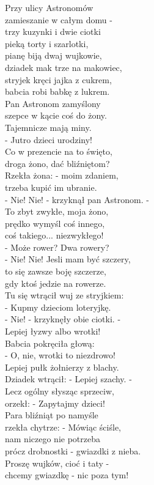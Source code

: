\documentclass[11pt,a4pape,leqno,twoside]{book}
\begin{document}
Przy ulicy Astronomów\\
zamieszanie w całym domu -\\
trzy kuzynki i dwie ciotki\\
pieką torty i szarlotki,\\
pianę biją dwaj wujkowie,\\
dziadek mak trze na makowiec,\\
stryjek kręci jajka z cukrem,\\
babcia robi babkę z lukrem.\\
Pan Astronom zamyślony\\
szepce w kącie coś do żony.\\
Tajemnicze mają miny.\\
- Jutro dzieci urodziny!\\
Co w prezencie na to święto,\\
droga żono, dać bliźniętom?\\
Rzekła żona: - moim zdaniem,\\
trzeba kupić im ubranie.\\
- Nie! Nie! - krzyknął pan Astronom. -\\
To zbyt zwykłe, moja żono,\\
prędko wymyśl coś innego,\\
coś takiego... niezwykłego!\\
- Może rower? Dwa rowery?\\
- Nie! Nie! Jesli mam być szczery,\\
to się zawsze boję szczerze,\\
gdy ktoś jedzie na rowerze.\\
Tu się wtrącił wuj ze stryjkiem:\\
- Kupmy dzieciom loteryjkę.\\
- Nie! - krzyknęły obie ciotki. -\\
Lepiej łyzwy albo wrotki!\\
Babcia pokręciła głową:\\
- O, nie, wrotki to niezdrowo!\\
Lepiej pułk żołnierzy z blachy.\\
Dziadek wtrącił: - Lepiej szachy. -\\
Lecz ogólny słysząc sprzeciw,\\
orzekł: - Zapytajmy dzieci!\\
Para bliźniąt po namyśle\\
rzekła chytrze: - Mówiąc ściśle,\\
nam niczego nie potrzeba\\
prócz drobnostki - gwiazdki z nieba.\\
Proszę wujków, cioć i taty -\\
chcemy gwiazdkę - nic poza tym!\\ \vspace{0.1cm}
\end{document}
